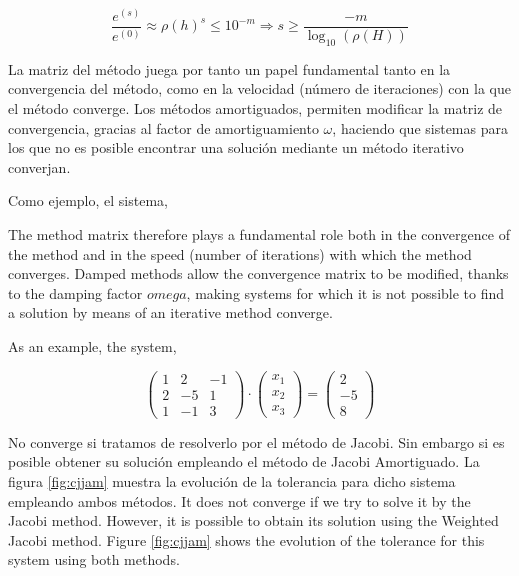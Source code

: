 \begin{equation*}
\frac{e^{(s)}}{e^{(0)}} \approx \rho(h)^s \leq 10^{-m} \Rightarrow s \geq \frac{-m}{\log_{10}\left(\rho(H)\right)}
\end{equation*}

\begin{paracol}{2}
La matriz del método juega por tanto un papel fundamental tanto en la convergencia del método, como en la velocidad (número de iteraciones) con la que el método converge. Los métodos amortiguados, permiten modificar la matriz de convergencia, gracias al factor de amortiguamiento $\omega$, haciendo que sistemas para los que no es posible encontrar una solución mediante un método iterativo converjan.

Como ejemplo, el sistema,

\switchcolumn
The method matrix therefore plays a fundamental role both in the convergence of the method and in the speed (number of iterations) with which the method converges. Damped methods allow the convergence matrix to be modified, thanks to the damping factor $omega$, making systems for which it is not possible to find a solution by means of an iterative method converge.

As an example, the system,
\end{paracol}

\begin{equation*}
\begin{pmatrix}
1& 2& -1\\
2& -5& 1\\
1& -1& 3
\end{pmatrix}\cdot \begin{pmatrix}
x_1\\
x_2\\
x_3
\end{pmatrix}=\begin{pmatrix}
2\\
-5\\
8
\end{pmatrix}
\end{equation*}

\begin{paracol}{2}
No converge si tratamos de resolverlo por el método de Jacobi. Sin embargo si es posible obtener su solución empleando el método de Jacobi Amortiguado. La figura \ref{fig:cjjam}  muestra la evolución de la tolerancia para dicho sistema empleando ambos métodos.
\switchcolumn
It does not converge if we try to solve it by the Jacobi method. However, it is possible to obtain its solution using the Weighted Jacobi method. Figure \ref{fig:cjjam} shows the evolution of the tolerance for this system using both methods.
\end{paracol}

